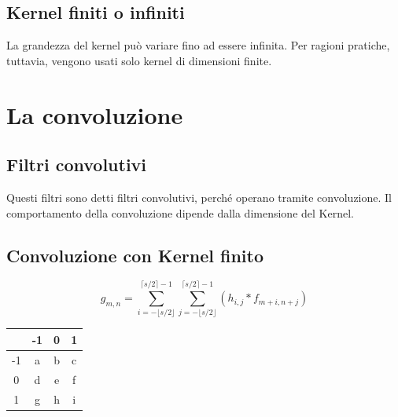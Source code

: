 \documentclass{report}
\begin{document}
	\subsection{Kernel finiti o infiniti}
	La grandezza del kernel può variare fino ad essere infinita.
	Per ragioni pratiche, tuttavia, vengono usati solo kernel di dimensioni finite.
	\newpage
	\section{La convoluzione}
	\subsection{Filtri convolutivi}
	Questi filtri sono detti filtri convolutivi, perché operano tramite convoluzione. Il comportamento della convoluzione dipende dalla dimensione del Kernel.
	\subsection{Convoluzione con Kernel finito}
	$$
	g_{m,n} = \sum^{\lceil s/2 \rceil-1}_{i=- \lfloor s/2 \rfloor}\sum^{\lceil s/2 \rceil-1}_{j=- \lfloor s/2 \rfloor} (h_{i,j}*f_{m+i, n+j})
	$$
		
	\begin{center}
		\begin{tabular}{| c | | c | c | c |} 
						    
			\hline
			   & -1 & 0 & 1 \\
			\hline 
			\hline
			-1 & a  & b & c \\
			\hline
			0  & d  & e & f \\
			\hline
			1  & g  & h & i \\
			\hline
		\end{tabular}
	\end{center}
		
\end{document}
